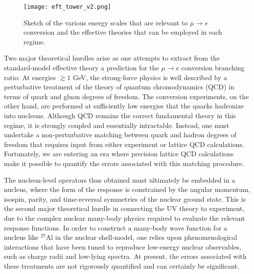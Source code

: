 \documentclass[12pt,letterpaper]{book}
\begin{document}
\begin{figure}
\centering
\texttt{[image: eft\_tower\_v2.png]}
\caption{Sketch of the various energy scales that are relevant to $\mu\rightarrow e$ conversion and the effective theories that can be employed in each regime.}
\label{fig:eft_tower}
\end{figure}

Two major theoretical hurdles arise as one attempts to extract from the standard-model effective theory a prediction for the $\mu\rightarrow e$ conversion branching ratio: At energies $\gtrsim 1$ GeV, the strong-force physics is well described by a perturbative treatment of the theory of quantum chromodynamics (QCD) in terms of quark and gluon degrees of freedom. The conversion experiments, on the other hand, are performed at sufficiently low energies that the quarks hadronize into nucleons. Although QCD remains the correct fundamental theory in this regime, it is strongly coupled and essentially intractable. Instead, one must undertake a non-perturbative matching between quark and hadron degrees of freedom that requires input from either experiment or lattice QCD calculations. Fortunately, we are entering an era where precision lattice QCD calculations make it possible to quantify the errors associated with this matching procedure. 

The nucleon-level operators thus obtained must ultimately be embedded in a nucleus, where the form of the response is constrained by the angular momentum, isospin, parity, and time-reversal symmetries of the nuclear ground state. This is the second major theoretical hurdle in connecting the UV theory to experiment, due to the complex nuclear many-body physics required to evaluate the relevant response functions. In order to construct a many-body wave function for a nucleus like $^{27}$Al in the nuclear shell-model, one relies upon phenomenological interactions that have been tuned to reproduce low-energy nuclear observables, such as charge radii and low-lying spectra. At present, the errors associated with these treatments are not rigorously quantified and can certainly be significant. 
\end{document}
